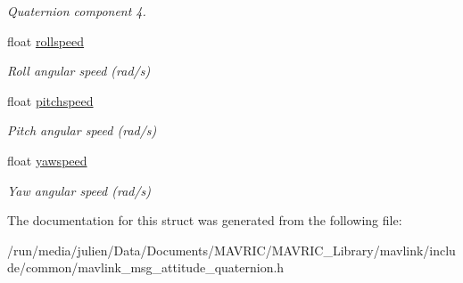 \begin{DoxyCompactItemize}
\begin{DoxyCompactList}\small\item\em Quaternion component 4. \end{DoxyCompactList}\item 
\hypertarget{struct____mavlink__attitude__quaternion__t_aa6ec530191df4da1f482533321684902}{float \hyperlink{struct____mavlink__attitude__quaternion__t_aa6ec530191df4da1f482533321684902}{rollspeed}}\label{struct____mavlink__attitude__quaternion__t_aa6ec530191df4da1f482533321684902}

\begin{DoxyCompactList}\small\item\em Roll angular speed (rad/s) \end{DoxyCompactList}\item 
\hypertarget{struct____mavlink__attitude__quaternion__t_ac77cd2999fca4230bf4fe7bcfe67c434}{float \hyperlink{struct____mavlink__attitude__quaternion__t_ac77cd2999fca4230bf4fe7bcfe67c434}{pitchspeed}}\label{struct____mavlink__attitude__quaternion__t_ac77cd2999fca4230bf4fe7bcfe67c434}

\begin{DoxyCompactList}\small\item\em Pitch angular speed (rad/s) \end{DoxyCompactList}\item 
\hypertarget{struct____mavlink__attitude__quaternion__t_a6e76b94100205e6f58df4232c1b4c32e}{float \hyperlink{struct____mavlink__attitude__quaternion__t_a6e76b94100205e6f58df4232c1b4c32e}{yawspeed}}\label{struct____mavlink__attitude__quaternion__t_a6e76b94100205e6f58df4232c1b4c32e}

\begin{DoxyCompactList}\small\item\em Yaw angular speed (rad/s) \end{DoxyCompactList}\end{DoxyCompactItemize}


The documentation for this struct was generated from the following file\+:\begin{DoxyCompactItemize}
\item 
/run/media/julien/\+Data/\+Documents/\+M\+A\+V\+R\+I\+C/\+M\+A\+V\+R\+I\+C\+\_\+\+Library/mavlink/include/common/mavlink\+\_\+msg\+\_\+attitude\+\_\+quaternion.\+h\end{DoxyCompactItemize}
